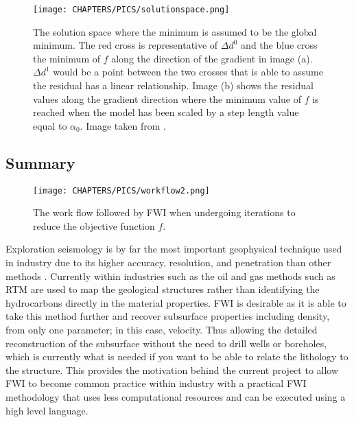 \begin{figure}[!ht]
\begin{center}
\texttt{[image: CHAPTERS/PICS/solutionspace.png]}
\caption[Solution space showing visually the gradient and the step length]{The solution space where the minimum is assumed to be the global minimum. The red cross is representative of $\Delta d^{0}$ and the blue cross the minimum of $f$ along the direction of the gradient in image (a). 
$\Delta d^{1}$ would be a point between the two crosses that is able to assume the residual has a linear relationship. Image (b) shows the residual values along the gradient direction where the minimum value of $f$ is reached when the model has been scaled by a step length value equal to $\alpha_{0}$. Image taken from \citet{guasch20123d}.}
\label{solutionspace}
\end{center}
\end{figure}

\subsection{Summary}

\begin{figure}[!ht]
\begin{center}
\texttt{[image: CHAPTERS/PICS/workflow2.png]}
\caption[FWI Workflow]{The work flow followed by FWI when undergoing iterations to reduce the objective function $f$. }
\label{fwiworkflow}
\end{center}
\end{figure}

Exploration seismology is by far the most important geophysical technique used in industry due to its higher accuracy, resolution, and penetration than other methods \citep{sheriff1995exploration}. Currently within industries such as the oil and gas methods such as RTM are used to map the geological structures rather than identifying the hydrocarbons directly in the material properties. FWI is desirable as it is able to take this method further and recover subsurface properties including density, from only one parameter; in this case, velocity. Thus allowing the detailed reconstruction of the subsurface without the need to drill wells or boreholes, which is currently what is needed if you want to be able to relate the lithology to the structure. This provides the motivation behind the current project to allow FWI to become common practice within industry with a practical FWI methodology that uses less computational resources and can be executed using a high level language. 